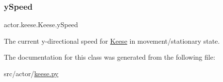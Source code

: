 \mbox{\label{classactor_1_1keese_1_1_keese_a6a288010700b821bc27840aa94faf35f}} 
\subsubsection{\texorpdfstring{y\+Speed}{ySpeed}}
{\footnotesize\ttfamily actor.\+keese.\+Keese.\+y\+Speed}



The current y-\/directional speed for \hyperlink{classactor_1_1keese_1_1_keese}{Keese} in movement/stationary state. 



The documentation for this class was generated from the following file\+:\begin{DoxyCompactItemize}
\item 
src/actor/\hyperlink{keese_8py}{keese.\+py}\end{DoxyCompactItemize}
